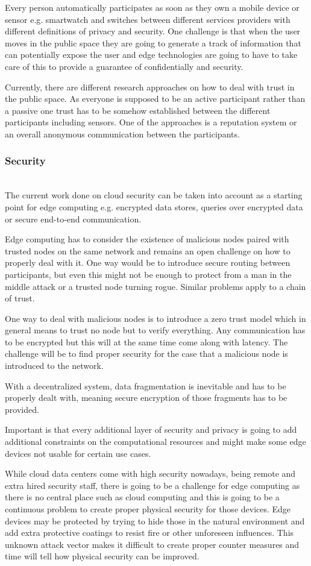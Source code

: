 Every person automatically participates as soon as they own a mobile device or sensor e.g. smartwatch and switches between different services providers with different definitions of privacy and security.
One challenge is that when the user moves in the public space they are going to generate a track of information that can potentially expose the user and edge technologies are going to have to take care of this to provide a guarantee of confidentially and security.

Currently, there are different research approaches on how to deal with trust in the public space. As everyone is supposed to be an active participant rather than a passive one trust has to be somehow established between the different participants including sensors.
One of the approaches is a reputation system or an overall anonymous communication between the participants.

\subsubsection{Security}\hspace*{\fill} \\
The current work done on cloud security can be taken into account as a starting point for edge computing e.g. encrypted data stores, queries over encrypted data or secure end-to-end communication.

Edge computing has to consider the existence of malicious nodes paired with trusted nodes on the same network and remains an open challenge on how to properly deal with it.
One way would be to introduce secure routing between participants, but even this might not be enough to protect from a man in the middle attack or a trusted node turning rogue. Similar problems apply to a chain of trust.

One way to deal with malicious nodes is to introduce a zero trust model which in general means to trust no node but to verify everything. Any communication has to be encrypted but this will at the same time come along with latency.
The challenge will be to find proper security for the case that a malicious node is introduced to the network.

With a decentralized system, data fragmentation is inevitable and has to be properly dealt with, meaning secure encryption of those fragments has to be provided.

Important is that every additional layer of security and privacy is going to add additional constraints on the computational resources and might make some edge devices not usable for certain use cases.

While cloud data centers come with high security nowadays, being remote and extra hired security staff, there is going to be a challenge for edge computing as there is no central place such as cloud computing and this is going to be a continuous problem to create proper physical security for those devices. 
Edge devices may be protected by trying to hide those in the natural environment and add extra protective coatings to resist fire or other unforeseen influences. This unknown attack vector makes it difficult to create proper counter measures and time will tell how physical security can be improved.